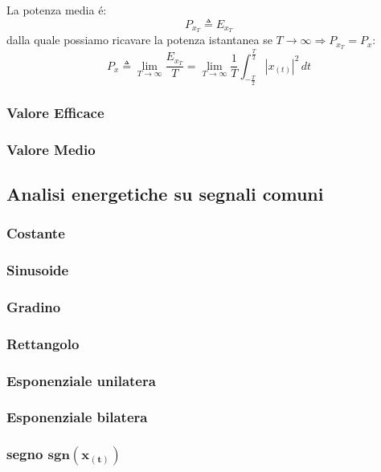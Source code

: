             La potenza media é:
            \[
                P_{x_{T}} \triangleq E_{x_{T}}   
            \]
            dalla quale possiamo ricavare la potenza istantanea se $T \rightarrow \infty \Rightarrow P_{x_{T}} = P_{x}$:
            \[
                P_{x} \triangleq \lim_{T\rightarrow\infty} \frac{E_{x_{T}}}{T} =\lim_{T\rightarrow\infty} \frac{1}{T} \int_{-\frac{T}{2}}^{\frac{T}{2}}  |x_{(t)}|^2 \,dt    
            \]  
        \subsubsection{Valore Efficace}
        
        \subsubsection{Valore Medio}

    \subsection{Analisi energetiche su segnali comuni}
        \subsubsection{Costante}

        \subsubsection{Sinusoide}
        
        \subsubsection{Gradino}
        
        \subsubsection{Rettangolo}
        
        \subsubsection{Esponenziale unilatera}
        
        \subsubsection{Esponenziale bilatera}
        
        \subsubsection{segno $\mathbf{sgn(x_{(t)})}$}